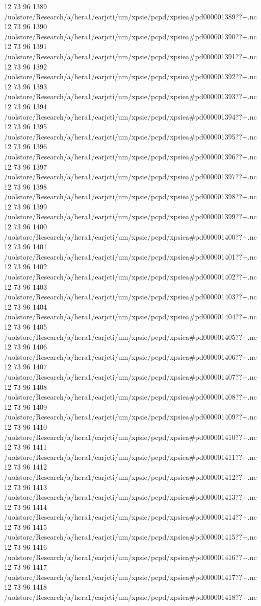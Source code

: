 12 73 96
1389
/uolstore/Research/a/hera1/earjcti/um/xpsie/pcpd/xpsiea#pd000001389??+.nc
12 73 96
1390
/uolstore/Research/a/hera1/earjcti/um/xpsie/pcpd/xpsiea#pd000001390??+.nc
12 73 96
1391
/uolstore/Research/a/hera1/earjcti/um/xpsie/pcpd/xpsiea#pd000001391??+.nc
12 73 96
1392
/uolstore/Research/a/hera1/earjcti/um/xpsie/pcpd/xpsiea#pd000001392??+.nc
12 73 96
1393
/uolstore/Research/a/hera1/earjcti/um/xpsie/pcpd/xpsiea#pd000001393??+.nc
12 73 96
1394
/uolstore/Research/a/hera1/earjcti/um/xpsie/pcpd/xpsiea#pd000001394??+.nc
12 73 96
1395
/uolstore/Research/a/hera1/earjcti/um/xpsie/pcpd/xpsiea#pd000001395??+.nc
12 73 96
1396
/uolstore/Research/a/hera1/earjcti/um/xpsie/pcpd/xpsiea#pd000001396??+.nc
12 73 96
1397
/uolstore/Research/a/hera1/earjcti/um/xpsie/pcpd/xpsiea#pd000001397??+.nc
12 73 96
1398
/uolstore/Research/a/hera1/earjcti/um/xpsie/pcpd/xpsiea#pd000001398??+.nc
12 73 96
1399
/uolstore/Research/a/hera1/earjcti/um/xpsie/pcpd/xpsiea#pd000001399??+.nc
12 73 96
1400
/uolstore/Research/a/hera1/earjcti/um/xpsie/pcpd/xpsiea#pd000001400??+.nc
12 73 96
1401
/uolstore/Research/a/hera1/earjcti/um/xpsie/pcpd/xpsiea#pd000001401??+.nc
12 73 96
1402
/uolstore/Research/a/hera1/earjcti/um/xpsie/pcpd/xpsiea#pd000001402??+.nc
12 73 96
1403
/uolstore/Research/a/hera1/earjcti/um/xpsie/pcpd/xpsiea#pd000001403??+.nc
12 73 96
1404
/uolstore/Research/a/hera1/earjcti/um/xpsie/pcpd/xpsiea#pd000001404??+.nc
12 73 96
1405
/uolstore/Research/a/hera1/earjcti/um/xpsie/pcpd/xpsiea#pd000001405??+.nc
12 73 96
1406
/uolstore/Research/a/hera1/earjcti/um/xpsie/pcpd/xpsiea#pd000001406??+.nc
12 73 96
1407
/uolstore/Research/a/hera1/earjcti/um/xpsie/pcpd/xpsiea#pd000001407??+.nc
12 73 96
1408
/uolstore/Research/a/hera1/earjcti/um/xpsie/pcpd/xpsiea#pd000001408??+.nc
12 73 96
1409
/uolstore/Research/a/hera1/earjcti/um/xpsie/pcpd/xpsiea#pd000001409??+.nc
12 73 96
1410
/uolstore/Research/a/hera1/earjcti/um/xpsie/pcpd/xpsiea#pd000001410??+.nc
12 73 96
1411
/uolstore/Research/a/hera1/earjcti/um/xpsie/pcpd/xpsiea#pd000001411??+.nc
12 73 96
1412
/uolstore/Research/a/hera1/earjcti/um/xpsie/pcpd/xpsiea#pd000001412??+.nc
12 73 96
1413
/uolstore/Research/a/hera1/earjcti/um/xpsie/pcpd/xpsiea#pd000001413??+.nc
12 73 96
1414
/uolstore/Research/a/hera1/earjcti/um/xpsie/pcpd/xpsiea#pd000001414??+.nc
12 73 96
1415
/uolstore/Research/a/hera1/earjcti/um/xpsie/pcpd/xpsiea#pd000001415??+.nc
12 73 96
1416
/uolstore/Research/a/hera1/earjcti/um/xpsie/pcpd/xpsiea#pd000001416??+.nc
12 73 96
1417
/uolstore/Research/a/hera1/earjcti/um/xpsie/pcpd/xpsiea#pd000001417??+.nc
12 73 96
1418
/uolstore/Research/a/hera1/earjcti/um/xpsie/pcpd/xpsiea#pd000001418??+.nc

